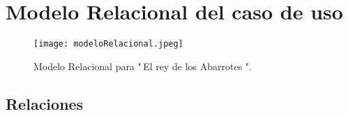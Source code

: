 \documentclass[10pt]{article}
\begin{document}
   
   
   

	\section{Modelo Relacional del caso de uso}
	
	
	
	\begin{figure}[H]
		\centering
		\texttt{[image: modeloRelacional.jpeg]}
		\caption{Modelo Relacional para "\,El rey de los Abarrotes ".}
	\end{figure}
	

    
    \subsection{Relaciones}
    
    
    
\end{document}
